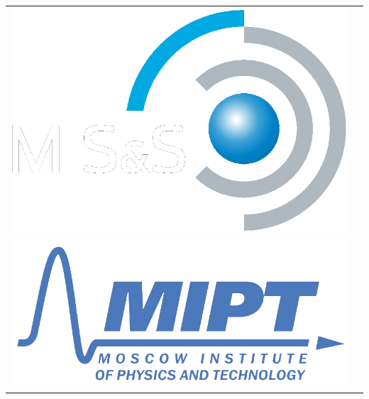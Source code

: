 \documentclass[a0, portrait]{a0poster}
\begin{document}
\begin{minipage}{0.35\textwidth}
\vspace{-11cm}
\begin{tabular}{c c}
\includegraphics[height=0.035\textheight]{misislogo}\\
\includegraphics[height=0.0225\textheight]{miptlogo}
\end{tabular}
\end{minipage}
\end{document}
